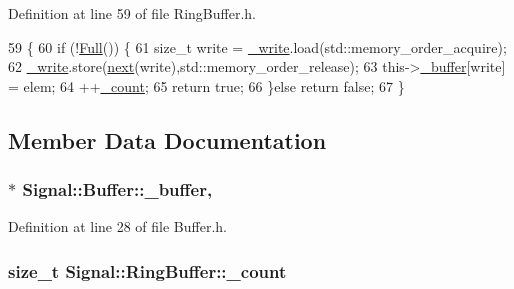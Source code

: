 Definition at line 59 of file Ring\+Buffer.\+h.


\begin{DoxyCode}
59                                                          \{
60         \textcolor{keywordflow}{if} (!\hyperlink{class_signal_1_1_ring_buffer_ac8124016cfc0c833a3565c87d5f6f1e5}{Full}()) \{
61             \textcolor{keywordtype}{size\_t} write = \hyperlink{class_signal_1_1_ring_buffer_a121cbb3679c61132fad237c671d08bef}{\_write}.load(std::memory\_order\_acquire);
62             \hyperlink{class_signal_1_1_ring_buffer_a121cbb3679c61132fad237c671d08bef}{\_write}.store(\hyperlink{class_signal_1_1_ring_buffer_a14a5990d51a45d131ee8aebd90bb87b9}{next}(write),std::memory\_order\_release);
63             this->\hyperlink{class_signal_1_1_buffer_ae88831d6fdf8fd7591d5dd7f79531d5f}{\_buffer}[write] = elem;
64             ++\hyperlink{class_signal_1_1_ring_buffer_ab41dbb1bd8c572099349f92055ed9185}{\_count};
65             \textcolor{keywordflow}{return} \textcolor{keyword}{true};
66         \}\textcolor{keywordflow}{else} \textcolor{keywordflow}{return} \textcolor{keyword}{false};
67     \}
\end{DoxyCode}


\subsection{Member Data Documentation}
\hypertarget{class_signal_1_1_buffer_ae88831d6fdf8fd7591d5dd7f79531d5f}{
\subsubsection[{\+\_\+buffer}]{$\ast$ Signal\+::\+Buffer\+::\+\_\+buffer\hspace{0.3cm}{\ttfamily [protected]}, {\ttfamily [inherited]}}}\label{class_signal_1_1_buffer_ae88831d6fdf8fd7591d5dd7f79531d5f}


Definition at line 28 of file Buffer.\+h.

\hypertarget{class_signal_1_1_ring_buffer_ab41dbb1bd8c572099349f92055ed9185}{
\subsubsection[{\+\_\+count}]{\setlength{\rightskip}{0pt plus 5cm}size\+\_\+t Signal\+::\+Ring\+Buffer\+::\+\_\+count\hspace{0.3cm}{\ttfamily [protected]}}}\label{class_signal_1_1_ring_buffer_ab41dbb1bd8c572099349f92055ed9185}


